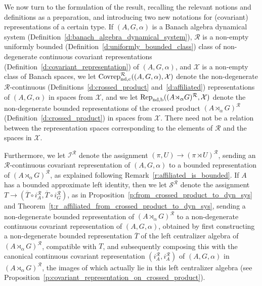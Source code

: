 \documentclass{amsart}
\theoremstyle{plain}
\theoremstyle{definition}
\numberwithin{equation}{section}
\begin{document}
We now turn to the formulation of the result, recalling the relevant notions and definitions as a preparation, and introducing two new notations for (covariant) representations of a certain type. If ${(A,G,\alpha)}$ is a Banach algebra dynamical system (Definition~\ref{d:banach_algebra_dynamical_system}), ${\mathcal R}$ is a non-empty uniformly bounded (Definition~\ref{d:uniformly_bounded_class}) class of non-degenerate continuous covariant representations (Definition~\ref{d:covariant_representation}) of ${(A,G,\alpha)}$, and ${\mathcal X}$ is a non-empty class of Banach spaces, we let ${\ensuremath{{\textup{Covrep}}_{\textup{nd,c}}^{\mathcal R}}}({(A,G,\alpha)},{\mathcal X})$ denote the non-degenerate ${\mathcal R}$-continuous (Definitions~\ref{d:crossed_product} and~\ref{d:affiliated}) representations of $(A,G,\alpha)$ in spaces from ${\mathcal X}$, and we let ${\ensuremath{\textup{Rep}_{\textup{nd,b}}}}({(A {\rtimes}_\alpha G)^\mathcal{R}},{\mathcal X})$ denote the non-degenerate bounded representations of the crossed product ${(A {\rtimes}_\alpha G)^\mathcal{R}}$ (Definition~\ref{d:crossed_product}) in spaces from ${\mathcal X}$. There need not be a relation between the representation spaces corresponding to the elements of ${\mathcal R}$ and the spaces in ${\mathcal X}$.

Furthermore, we let ${{\mathcal I}^{\mathcal R}}$ denote the assignment ${(\pi,U)} \to ({\pi \rtimes U})^{\mathcal R}$, sending an ${\mathcal R}$-continuous covariant representation of ${(A,G,\alpha)}$ to a bounded representation of ${(A {\rtimes}_\alpha G)^\mathcal{R}}$, as explained following Remark~\ref{r:affiliated_is_bounded}. If $A$ has a bounded approximate left identity, then we let ${{\mathcal S}^{\mathcal R}}$ denote the assignment $T\to (\overline{T} \circ i_A^{\mathcal R}, \overline{T} \circ i_G^{\mathcal R})$, as in Proposition~\ref{p:from_crossed_product_to_dyn_sys} and Theorem~\ref{t:r_affiliated_from_crossed_product_to_dyn_sys}, sending a non-degenerate bounded representation of ${(A {\rtimes}_\alpha G)^\mathcal{R}}$ to a non-degenerate continuous covariant representation of ${(A,G,\alpha)}$, obtained by first constructing a non-degenerate bounded representation $\overline T$ of the left centralizer algebra of ${(A {\rtimes}_\alpha G)^\mathcal{R}}$, compatible with $T$, and subsequently composing this with the canonical continuous covariant representation $(i_A^{\mathcal R},i_A^{\mathcal R})$ of ${(A,G,\alpha)}$ in ${(A {\rtimes}_\alpha G)^\mathcal{R}}$, the images of which actually lie in this left centralizer algebra (see Proposition~\ref{p:covariant_representation_on_crossed_product}).
\end{document}
